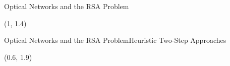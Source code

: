 \documentclass[english,aspectratio=169,dvipsnames]{beamer}
\begin{document}





% 		

% 		

\begin{frame}{Optical Networks and the RSA Problem}{}
	\begin{textblock}{5}(1, 1.4)
        
    \end{textblock}
\end{frame}


\begin{frame}{Optical Networks and the RSA Problem}{Heuristic Two-Step Approaches}
	\begin{textblock}{5}(0.6, 1.9)
        
    \end{textblock}
\end{frame}
\end{document}
